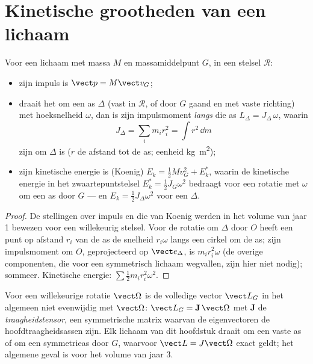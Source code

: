 \section{Kinetische grootheden van een lichaam}

\begin{proposition}\label{prop:b2:rigid-body-mechanics:kinetic}
Voor een lichaam met massa $M$ en massamiddelpunt $G$, in een stelsel $\mathcal R$:
\begin{itemize}
  \item zijn impuls is $\vect p = M\vect v_G$;
  \item draait het om een as $\Delta$ (vast in $\mathcal R$, of door $G$
        gaand en met vaste richting) met hoeksnelheid $\omega$, dan is
        zijn impulsmoment \emph{langs} die as
        $L_\Delta = J_\Delta\,\omega$, waarin
        \[
        J_\Delta = \sum_i m_i r_i^2 = \int r^2\,\dd m
        \]
        zijn \emph{} om $\Delta$ is ($r$ de afstand tot
        de as; eenheid \unit{kg.m^2});
  \item zijn kinetische energie is (Koenig)
        $E_k = \tfrac12Mv_G^2 +
        E_k^*$, waarin de kinetische energie
        in het zwaartepuntstelsel
        $E_k^* = \tfrac12J_{G}\omega^2$ bedraagt voor een rotatie met
        $\omega$ om een as door $G$ --- en $E_k = \tfrac12J_\Delta\omega^2$
        voor een  $\Delta$.
\end{itemize}
\end{proposition}

\begin{proof}
De stellingen over impuls en die van Koenig werden in het volume van jaar 1
bewezen voor een willekeurig stelsel. Voor de rotatie om $\Delta$ door $O$
heeft een punt op afstand $r_i$ van de as de snelheid $r_i\omega$ langs
een cirkel om de as; zijn impulsmoment om $O$, geprojecteerd op
$\vect e_\Delta$, is $m_ir_i^2\omega$ (de overige componenten, die voor een
symmetrisch lichaam wegvallen, zijn hier niet nodig); sommeer. Kinetische
energie: $\sum\tfrac12m_ir_i^2
\omega^2$.
\end{proof}

\begin{remark}\label{rem:b2:rigid-body-mechanics:tensor}
Voor een willekeurige rotatie $\vect\Omega$ is de volledige vector
$\vect L_G$ in het algemeen niet evenwijdig met $\vect\Omega$:
$\vect L_G = \mathbf J\,\vect\Omega$ met $\mathbf J$ de
\emph{traagheidstensor}, een
symmetrische matrix waarvan de eigenvectoren de hoofdtraagheidsassen zijn.
Elk lichaam van dit hoofdstuk draait om een vaste as of om een
symmetrieas door $G$, waarvoor $\vect L = J\vect\Omega$ exact geldt; het
algemene geval is voor het volume van jaar 3.
\end{remark}

